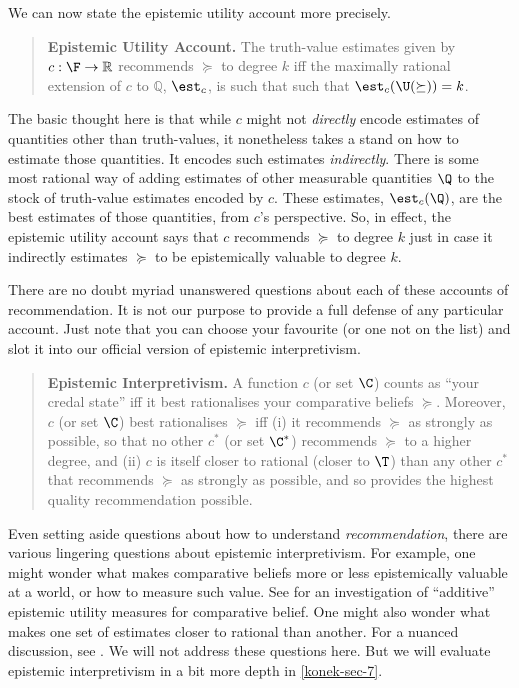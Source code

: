 We can now state the epistemic utility account more precisely.
\begin{quote}
\textbf{Epistemic Utility Account.} The truth-value estimates given by $c:\F\rightarrow\mathbb{R}$ recommends $\succeq$ to degree $k$ iff the maximally rational extension of $c$ to $\mathbb{Q}$, $\est_c$, is such that such that $\est_c(\U(\succeq))=k$.
\end{quote}
The basic thought here is that while $c$ might not \textit{directly} encode estimates of quantities other than truth-values, it nonetheless takes a stand on how to estimate those quantities. It encodes such estimates \textit{indirectly}. There is some most rational way of adding estimates of other measurable quantities $\Q$ to the stock of truth-value estimates encoded by $c$. These estimates, $\est_c(\Q)$, are the best estimates of those quantities, from $c$'s perspective. So, in effect, the epistemic utility account says that $c$ recommends $\succeq$ to degree $k$ just in case it indirectly estimates $\succeq$ to be epistemically valuable to degree $k$.

There are no doubt myriad unanswered questions about each of these accounts of recommendation. It is not our purpose to provide a full defense of any particular account. Just note that you can choose your favourite (or one not on the list) and slot it into our official version of epistemic interpretivism.
\begin{quote}
\textbf{Epistemic Interpretivism.} A function $c$ (or set $\C$) counts as ``your credal state'' iff it best rationalises your comparative beliefs $\succeq$. Moreover, $c$ (or set $\C$) best rationalises $\succeq$ iff (i) it recommends $\succeq$ as strongly as possible, so that no other $c^*$ (or set $\C^*$) recommends $\succeq$ to a higher degree, and (ii) $c$ is itself closer to rational (closer to $\T$) than any other $c^*$ that recommends $\succeq$ as strongly as possible, and so provides the highest quality recommendation possible. 
\end{quote}

Even setting aside questions about how to understand \textit{recommendation}, there are various lingering questions about epistemic interpretivism. For example, one might wonder what makes comparative beliefs more or less epistemically valuable at a world, or how to measure such value. See \citet{Fitelson2015} for an investigation of ``additive'' epistemic utility measures for comparative belief. One might also wonder what makes one set of estimates closer to rational than another. For a nuanced discussion, see \citet{Staffel2018}. We will not address these questions here. But we will evaluate epistemic interpretivism in a bit more depth in \autoref{konek-sec-7}.


